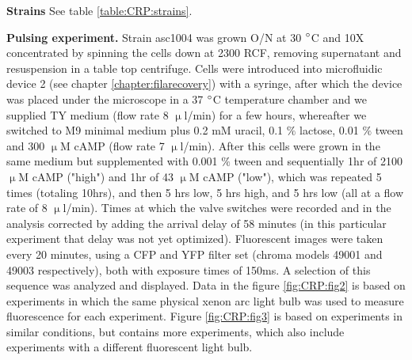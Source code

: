 \textbf{Strains} See table \ref{table:CRP:strains}.

\textbf{Pulsing experiment.} Strain asc1004 was grown O/N at 30 $\degree$C and 10X concentrated by spinning the cells down at 2300 RCF, removing supernatant and resuspension in a table top centrifuge.
Cells were introduced into microfluidic device 2 (see chapter \ref{chapter:filarecovery}) with a syringe, after which the device was placed under the microscope in a 37 $\degree$C temperature chamber and we supplied TY medium (flow rate 8 $\upmu$l/min) for a few hours, whereafter we switched to M9 minimal medium plus 0.2 mM uracil, 0.1 $\%$ lactose, 0.01 $\%$ tween and 300 $\upmu$M cAMP (flow rate 7 $\upmu$l/min).
After this cells were grown in the same medium but supplemented with 0.001 $\%$ tween and sequentially 1hr of 2100 $\upmu$M cAMP ("high") and 1hr of 43 $\upmu$M cAMP ("low"), which was repeated 5 times (totaling 10hrs), and then 5 hrs low, 5 hrs high, and 5 hrs low (all at a flow rate of 8 $\upmu$l/min). 
Times at which the valve switches were recorded and in the analysis corrected by adding the arrival delay of 58 minutes (in this particular experiment that delay was not yet optimized).
Fluorescent images were taken every 20 minutes, using a CFP and YFP filter set (chroma models 49001 and 49003 respectively), both with exposure times of 150ms.
A selection of this sequence was analyzed and displayed.  
Data in the figure \ref{fig:CRP:fig2} is based on experiments in which the same physical xenon arc light bulb was used to measure fluorescence for each experiment.
Figure \ref{fig:CRP:fig3} is based on experiments in similar conditions, but contains more experiments, which also include experiments with a different fluorescent light bulb.

